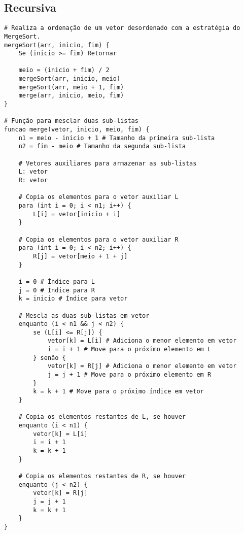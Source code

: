 \subsection{Recursiva}
\begin{verbatim}
# Realiza a ordenação de um vetor desordenado com a estratégia do MergeSort.
mergeSort(arr, inicio, fim) {
    Se (inicio >= fim) Retornar

    meio = (inicio + fim) / 2
    mergeSort(arr, inicio, meio)
    mergeSort(arr, meio + 1, fim)
    merge(arr, inicio, meio, fim)
}

# Função para mesclar duas sub-listas
funcao merge(vetor, inicio, meio, fim) {
    n1 = meio - inicio + 1 # Tamanho da primeira sub-lista
    n2 = fim - meio # Tamanho da segunda sub-lista

    # Vetores auxiliares para armazenar as sub-listas
    L: vetor
    R: vetor

    # Copia os elementos para o vetor auxiliar L
    para (int i = 0; i < n1; i++) {
        L[i] = vetor[inicio + i]
    }

    # Copia os elementos para o vetor auxiliar R
    para (int i = 0; i < n2; i++) {
        R[j] = vetor[meio + 1 + j]
    }

    i = 0 # Índice para L
    j = 0 # Índice para R
    k = inicio # Índice para vetor

    # Mescla as duas sub-listas em vetor
    enquanto (i < n1 && j < n2) {
        se (L[i] <= R[j]) {
            vetor[k] = L[i] # Adiciona o menor elemento em vetor
            i = i + 1 # Move para o próximo elemento em L
        } senão {
            vetor[k] = R[j] # Adiciona o menor elemento em vetor
            j = j + 1 # Move para o próximo elemento em R
        }
        k = k + 1 # Move para o próximo índice em vetor
    }

    # Copia os elementos restantes de L, se houver
    enquanto (i < n1) {
        vetor[k] = L[i]
        i = i + 1
        k = k + 1
    }

    # Copia os elementos restantes de R, se houver
    enquanto (j < n2) {
        vetor[k] = R[j]
        j = j + 1
        k = k + 1
    }
}
\end{verbatim}